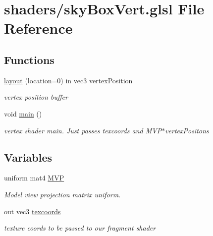 \hypertarget{sky_box_vert_8glsl}{\section{shaders/sky\-Box\-Vert.glsl File Reference}
\label{sky_box_vert_8glsl}
}
\subsection*{Functions}
\begin{DoxyCompactItemize}
\item 
\hypertarget{sky_box_vert_8glsl_a3a9bed495f596aa8aed4121aacc43fdd}{\hyperlink{sky_box_vert_8glsl_a3a9bed495f596aa8aed4121aacc43fdd}{layout} (location=0) in vec3 vertex\-Position}\label{sky_box_vert_8glsl_a3a9bed495f596aa8aed4121aacc43fdd}

\begin{DoxyCompactList}\small\item\em vertex position buffer \end{DoxyCompactList}\item 
\hypertarget{sky_box_vert_8glsl_acdef7a1fd863a6d3770c1268cb06add3}{void \hyperlink{sky_box_vert_8glsl_acdef7a1fd863a6d3770c1268cb06add3}{main} ()}\label{sky_box_vert_8glsl_acdef7a1fd863a6d3770c1268cb06add3}

\begin{DoxyCompactList}\small\item\em vertex shader main. Just passes texcoords and M\-V\-P$\ast$vertex\-Positons \end{DoxyCompactList}\end{DoxyCompactItemize}
\subsection*{Variables}
\begin{DoxyCompactItemize}
\item 
\hypertarget{sky_box_vert_8glsl_ae56d8b04842b99426c8844c0785d3090}{uniform mat4 \hyperlink{sky_box_vert_8glsl_ae56d8b04842b99426c8844c0785d3090}{M\-V\-P}}\label{sky_box_vert_8glsl_ae56d8b04842b99426c8844c0785d3090}

\begin{DoxyCompactList}\small\item\em Model view projection matrix uniform. \end{DoxyCompactList}\item 
\hypertarget{sky_box_vert_8glsl_a71c0fbb5bdc732da08d0a88822242470}{out vec3 \hyperlink{sky_box_vert_8glsl_a71c0fbb5bdc732da08d0a88822242470}{texcoords}}\label{sky_box_vert_8glsl_a71c0fbb5bdc732da08d0a88822242470}

\begin{DoxyCompactList}\small\item\em texture coords to be passed to our fragment shader \end{DoxyCompactList}\end{DoxyCompactItemize}


